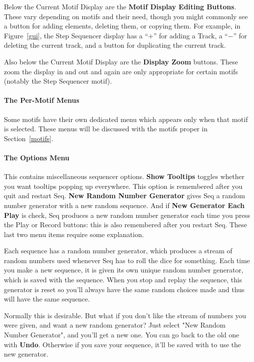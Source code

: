 \documentclass[twoside,10pt]{article}
\begin{document}
 Below the Current Motif Display are the {\bf Motif Display Editing Buttons}.  These vary depending on motifs and their need, though you might commonly see a button for adding elements, deleting them, or copying them.  For example, in Figure~\ref{gui}, the Step Sequencer display has a ``\(+\)'' for adding a Track, a ``\(-\)'' for deleting the current track, and a button for duplicating the current track.

Also below the Current Motif Display are the {\bf Display Zoom} buttons.  These zoom the display in and out and again are only appropriate for certain motifs (notably the Step Sequencer motif).

\paragraph{The Per-Motif Menus}  Some motifs have their own dedicated menu which appears only when that motif is selected.  These menus will be discussed with the motifs proper in Section~\ref{motifs}.

\paragraph{The Options Menu}  This contains miscellaneous sequencer options.  {\bf Show Tooltips} toggles whether you want tooltips popping up everywhere.  This option is remembered after you quit and restart Seq.  {\bf  New Random Number Generator} gives Seq a random number generator with a new random sequence.  And if {\bf New Generator Each Play} is check, Seq produces a new random number generator each time you press the Play or Record buttons: this is also remembered after you restart Seq.  These last two menu items require some explanation.

Each sequence has a random number generator, which produces a stream of random numbers used whenever Seq has to roll the dice for something.  Each time you make a new sequence, it is given its own  unique random number generator, which is saved with the sequence.  When you stop and replay the sequence, this generator is reset so you'll always have the same random choices made and thus will have the same sequence.

Normally this is desirable.  But what if you don't like the stream of numbers you were given, and want a new random generator?  Just select "New Random Number Generator", and you'll get a new one.  You can go back to the old one with {\bf Undo}.  Otherwise if you save your sequence, it'll be saved with to use the new generator.
\end{document}
